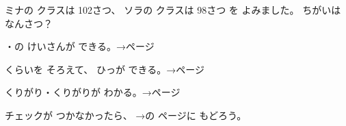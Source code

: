 \bkproblem ミナの クラスは 102さつ、 ソラの クラスは 98さつ を よみました。 ちがいは なんさつ？
\bkshikiran
{}

\begin{furikaeri}
\begin{checklist}
\item {}・の けいさんが できる。\hfill{\footnotesize\sffamily\color{bkTheme}→\pageref{bk:1-7:matomari}ページ}
\item くらいを そろえて、 ひっが できる。\hfill{\footnotesize\sffamily\color{bkTheme}→\pageref{bk:1-7:kuraigoto}ページ}
\item くりがり・くりがりが わかる。\hfill{\footnotesize\sffamily\color{bkTheme}→\pageref{bk:1-7:kuriagari}ページ}
\end{checklist}
チェックが つかなかったら、 →の ページに もどろう。
\end{furikaeri}

\clearpage

